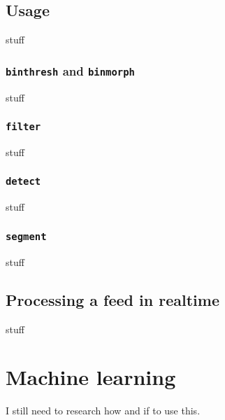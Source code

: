 \documentclass[letter]{article}
\begin{document}
\subsection{Usage} 
stuff

\subsubsection{\texttt{binthresh} and \texttt{binmorph}}
stuff

\subsubsection{\texttt{filter}}
stuff

\subsubsection{\texttt{detect}}
stuff

\subsubsection{\texttt{segment}}
stuff

\subsection{Processing a feed in realtime}
stuff

\section{Machine learning}
I still need to research how and if to use this. 
\end{document}
